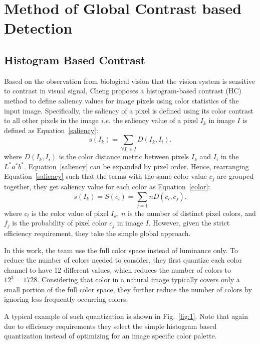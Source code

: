 \documentclass[10pt,twocolumn,letterpaper]{article}
\begin{document}
\section{Method of Global Contrast based Detection}


\subsection{Histogram Based Contrast}

Based on the observation from biological vision that the vision system is sensitive to contrast in visual signal, Cheng proposes a histogram-based contrast (HC) method to define saliency values for image pixels using color statistics of the input image. Specifically, the saliency of a pixel is defined using its color contrast to all other pixels in the image \emph{i.e.} the saliency value of a pixel $I_k$ in image $I$ is defined as Equation~\ref{saliency}:
\begin{equation}
s(I_k)=\sum_{\forall I_i\in I} D(I_k,I_i).   \label{saliency}
\end{equation}
where $D(I_k,I_i)$ is the color distance metric between pixels $I_k$ and $I_i$ in the $L^*a^*b^*$. Equation~\ref{saliency} can be expanded by pixel order. Hence, rearranging Equation~\ref{saliency} such that the terms with the same color value $c_j$ are grouped together, they get saliency value for each color as Equation~\ref{color}:
\begin{equation}
s(I_k)=S(c_l)=\sum_{j=1}{n} D(c_l,c_j).   \label{color}
\end{equation}
where $c_l$ is the color value of pixel $I_k$, $n$ is the number of distinct pixel colors, and $f_j$ is the probability of pixel color $c_j$ in image $I$. However, given the strict efficiency requirement, they take the simple global approach.

In this work, the team use the full color space instead of luminance only. To reduce the number of colors needed to consider, they first quantize each color channel to have 12 different values, which reduces the number of colors to $12^3 = 1728$. Considering that color in a natural image typically covers only a small portion of the full color space, they further reduce the number of colors by ignoring less frequently occurring colors.

A typical example of such quantization is shown in Fig.~\ref{fig:1}. Note that again due to efficiency requirements they select the simple histogram based quantization instead of optimizing for an image specific color palette.
\end{document}
